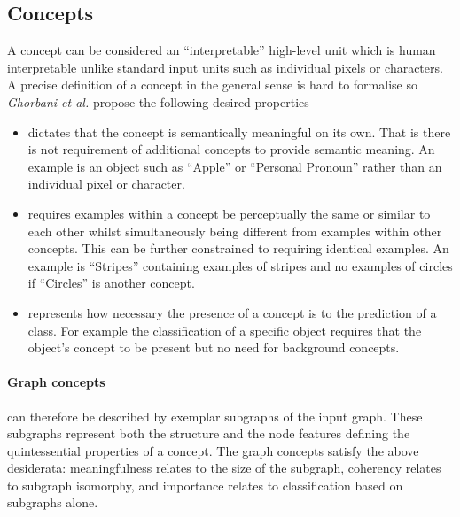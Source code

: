 \subsection{Concepts}



A concept can be considered an ``interpretable'' high-level unit which is human interpretable unlike standard input units such as individual pixels or characters.
A precise definition of a concept in the general sense is hard to formalise so \textit{Ghorbani et al.}\cite{ghorbani2019towards} propose the following desired properties
\begin{itemize}
    \item[]
        dictates that the concept is semantically meaningful on its own.
        That is there is not requirement of additional concepts to provide semantic meaning.
        An example is an object such as ``Apple'' or ``Personal Pronoun'' rather than an individual pixel or character.
    \item[]
        requires examples within a concept be perceptually the same or similar to each other whilst simultaneously being different from examples within other concepts.
        This can be further constrained to requiring identical examples.
        An example is ``Stripes'' containing examples of stripes and no examples of circles if ``Circles'' is another concept.
    \item[]
        represents how necessary the presence of a concept is to the prediction of a class.
        For example the classification of a specific object requires that the object's concept to be present but no need for background concepts.
\end{itemize}



\paragraph{Graph concepts} can therefore be described by exemplar subgraphs of the input graph.
These subgraphs represent both the structure and the node features defining the quintessential properties of a concept.
The graph concepts satisfy the above desiderata: meaningfulness relates to the size of the subgraph, coherency relates to subgraph isomorphy, and importance relates to classification based on subgraphs alone.

